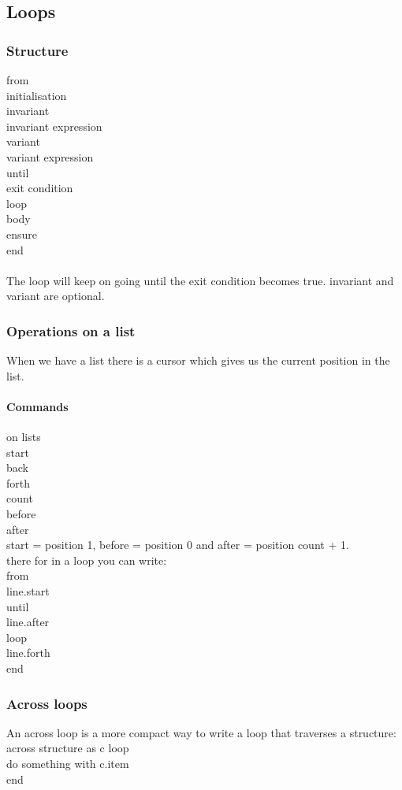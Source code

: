 \documentclass[11pt]{article}
\newcommand\tab[1][1cm]{\hspace*{#1}}
\begin{document}
\subsection{Loops}
\subsubsection{Structure}
from\\\tab initialisation\\invariant\\\tab invariant expression\\variant\\\tab variant expression \\until\\\tab exit condition\\loop\\\tab body\\ensure\\end\\\\
The loop will keep on going until the exit condition becomes true. invariant and variant are optional.
\subsubsection{Operations on a list}
When we have a list there is a cursor which gives us the current position in the list.
\paragraph{Commands}on lists\\
\tab start\\\tab back\\\tab forth\\\tab count\\\tab before\\\tab after\\ start = position 1, before = position 0 and after = position count + 1.\\ there for in a loop you can write:\\from \\\tab line.start\\until \\\tab line.after\\loop\\\tab line.forth\\end\\
\subsubsection{Across loops}
An across loop is a more compact way to write a loop that traverses a structure:\\across structure as c loop\\\tab do something with c.item\\end\\
\end{document}
